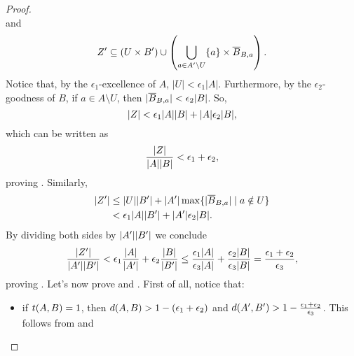\begin{lemma}
\begin{proof}
\[                \]
                and
                \[
                    Z' \subseteq (U \times B') \cup \left( \bigcup_{a \in A' \setminus U} \{ a \} \times \overline{B}_{B,a} \right).
                \]
                Notice that, by the $\epsilon_1$-excellence of $A$, $|U| < \epsilon_1 |A|$.
                Furthermore, by the $\epsilon_2$-goodness of $B$,
                if $a \in A \setminus U$, then $| \overline{B}_{B,a} | < \epsilon_2 | B |$.
                So,
                \[
                    | Z | < \epsilon_1 | A | | B | + | A | \epsilon_2 | B |,
                \]
                which can be written as
                \[
                        \frac{| Z |}{| A | | B |} < \epsilon_1 + \epsilon_2,
                \]
                proving .
                Similarly,
                \begin{align*}
                    | Z' | & \leq | U | | B' | + | A' | \max \{ | \overline{B}_{B,a} | \mid a \notin U \} \\
                                     & < \epsilon_1 | A | | B' | + | A' | \epsilon_2 | B |.
                \end{align*}
                By dividing both sides by $| A' | | B' |$ we conclude
                \[
                    \frac{| Z' |}{| A' | | B' |} < \epsilon_1 \frac{| A |}{| A' |} + \epsilon_2 \frac{| B |}{| B' |}
                    \leq \frac{\epsilon_1 | A |}{\epsilon_3 | A |} + \frac{\epsilon_2 | B |} {\epsilon_3 | B |}
                    = \frac{\epsilon_1 + \epsilon_2}{\epsilon_3},
                \]
                proving .
                Let's now prove  and .
                First of all, notice that:
                \begin{itemize}
                    \item if $t( A,B ) = 1$, then $d( A,B ) > 1 - ( \epsilon_1 + \epsilon_2 )$
                        and $d ( A',B' ) > 1 - \frac{\epsilon_1 + \epsilon_2}{\epsilon_3}$.
                        This follows from
                         and

\end{itemize}
\end{proof}
\end{lemma}
